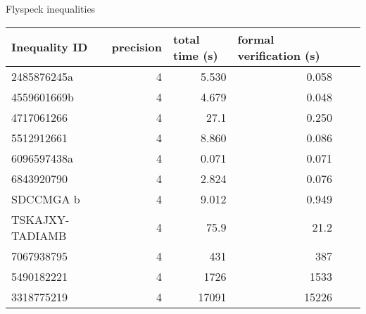 \documentclass[a4paper]{article}
\begin{document}
\begin{center}
Flyspeck inequalities

\begin{tabular}{l@{\quad} r r r r r}
\hline
\multicolumn{1}{l}{\rule{0pt}{12pt}Inequality ID}&
\multicolumn{1}{l}{\phantom{x}precision}&
\multicolumn{1}{l}{\phantom{x}total time (s)}&
\multicolumn{1}{l}{\phantom{x}formal verification (s)}\\
\hline\rule{0pt}{12pt}%
2485876245a     & 4 & 5.530 & 0.058 \\
4559601669b & 4 & 4.679 & 0.048 \\
4717061266  & 4 & 27.1 & 0.250 \\
5512912661  & 4 & 8.860 & 0.086 \\
6096597438a & 4 & 0.071 & 0.071 \\
6843920790  & 4 & 2.824 & 0.076 \\
SDCCMGA b   & 4 & 9.012 & 0.949 \\
TSKAJXY-TADIAMB\footnotemark[1] & 4 & 75.9 & 21.2 \\
7067938795  & 4 & 431   & 387 \\
5490182221  & 4 & 1726  & 1533 \\
3318775219  & 4 & 17091 & 15226 \\
\hline
\end{tabular}
\end{center}
\end{document}
